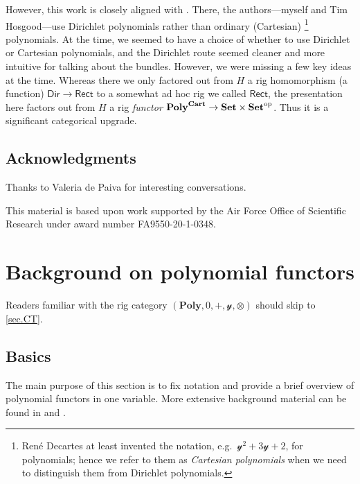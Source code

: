 \documentclass[11pt, one side, article]{memoir}
\theoremstyle{definition}
\theoremstyle{plain}
\newcommand{\Set}[1]{\mathsf{#1}}%
\newcommand{\Cat}[1]{\mathbf{#1}}%
\newcommand{\op}{^\tn{op}}
\newcommand{\tn}[1]{\textnormal{#1}}
\newcommand{\smset}{\Cat{Set}}
\newcommand{\yon}{\mathcal{y}}
\newcommand{\poly}{\Cat{Poly}}
\newcommand{\dir}{\Set{Dir}}
\newcommand{\rect}{\Set{Rect}}
\newcommand{\polycart}{\poly^{\Cat{Cart}}}
\newcommand{\0}{\textsf{0}}
\newcommand{\1}{\tn{\textsf{1}}}
\begin{document}
However, this work is closely aligned with \cite{spivak2021dirichlet}. There, the authors---myself and Tim Hosgood---use Dirichlet polynomials rather than ordinary (Cartesian)%
\footnote{Ren\'{e} Decartes at least invented the notation, e.g.\ $\yon^2+3\yon+2$, for polynomials; hence we refer to them as \emph{Cartesian polynomials} when we need to distinguish them from Dirichlet polynomials.}
polynomials. At the time, we seemed to have a choice of whether to use Dirichlet or Cartesian polynomials, and the Dirichlet route seemed cleaner and more intuitive for talking about the bundles. However, we were missing a few key ideas at the time. Whereas there we only factored out from $H$ a rig homomorphism (a function) $\dir\to\rect$ to a somewhat ad hoc rig we called $\rect$, the presentation here factors out from $H$ a rig \emph{functor} $\polycart\to\smset\times\smset\op$. Thus it is a significant categorical upgrade.

\section*{Acknowledgments}
Thanks to Valeria de Paiva for interesting conversations.

This material is based upon work supported by the Air Force Office of Scientific Research under award number FA9550-20-1-0348.

\chapter{Background on polynomial functors}\label{chap.background}

Readers familiar with the rig category $(\poly,0,+,\yon,\otimes)$ should skip to \cref{sec.CT}.

\section{Basics}


The main purpose of this section is to fix notation and provide a brief overview of polynomial functors in one variable. More extensive background material can be found in \cite{spivak2022poly} and \cite{kock2012polynomial}. 
\end{document}
